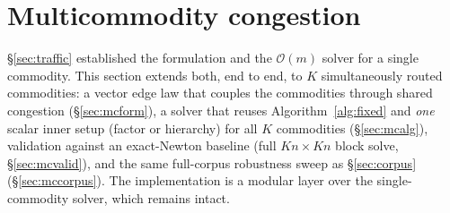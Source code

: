 \documentclass{siamart220329}
\newcommand{\Om}{\mathcal{O}(m)}
\begin{document}
\section{Multicommodity congestion}\label{sec:mc}
\S\ref{sec:traffic} established the formulation and the $\Om$ solver for a single commodity. This
section extends both, end to end, to $K$ simultaneously routed commodities: a vector edge law that
couples the commodities through shared congestion (\S\ref{sec:mcform}), a solver that reuses
Algorithm~\ref{alg:fixed} and \emph{one} scalar inner setup (factor or hierarchy) for all $K$ commodities
(\S\ref{sec:mcalg}), validation against an exact-Newton baseline (full $Kn\times Kn$ block solve, \S\ref{sec:mcvalid}), and the same
full-corpus robustness sweep as \S\ref{sec:corpus} (\S\ref{sec:mccorpus}). The implementation is a
modular layer over the single-commodity solver, which remains intact.
\end{document}

